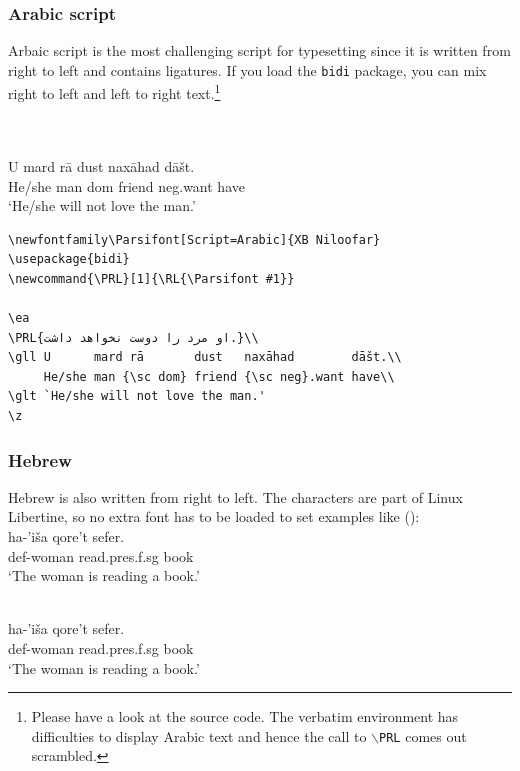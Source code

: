 \subsubsection{Arabic script}

Arbaic script is the most challenging script for typesetting since it is written from right to left
and contains ligatures. If you load the \texttt{bidi} package, you can mix right to left and left to
right text.\footnote{
  Please have a look at the source code. The verbatim environment has difficulties to display Arabic
  text and hence the call to \texttt{$\backslash$PRL} comes out scrambled.
}

\ea
{}\\

\\
 \gll U      mard rā        dust   naxāhad        dāšt.\\
      He/she man  {\sc dom} friend {\sc neg}.want have\\
\glt `He/she will not love the man.'
\z

\begin{verbatim}
\newfontfamily\Parsifont[Script=Arabic]{XB Niloofar}
\usepackage{bidi}
\newcommand{\PRL}[1]{\RL{\Parsifont #1}}

\ea
\PRL{او مرد را دوست نخواهد داشت.}\\
\gll U      mard rā       dust   naxāhad        dāšt.\\
     He/she man {\sc dom} friend {\sc neg}.want have\\
\glt `He/she will not love the man.'
\z
\end{verbatim}

\subsubsection{Hebrew}

Hebrew is also written from right to left. The characters are part of Linux Libertine, so no extra
font has to be loaded to set examples like ():
\ea
\glll {}\\
       ha-'iša          qore't	                          sefer.\\
       {\sc def}-woman  read.{\sc pres}.{\sc f}.{\sc sg}  book\\
\glt `The woman is reading a book.'
\z
\begin{fitverb}
\ea
\glll {}\\
       ha-'iša          qore't                            sefer.\\
       {\sc def}-woman  read.{\sc pres}.{\sc f}.{\sc sg}  book\\
\glt `The woman is reading a book.'
\z
\end{fitverb}

